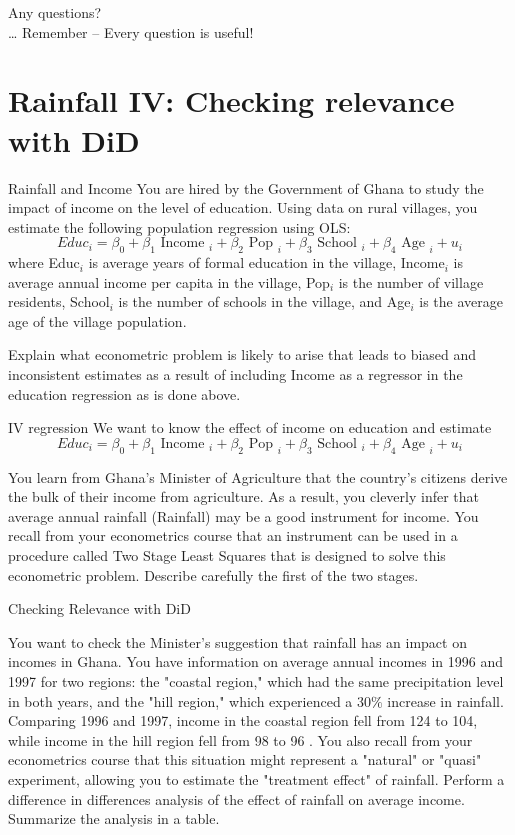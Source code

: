 \documentclass[11pt]{beamer}
\newcommand{\questionslide}[0]{
{\setbeamercolor{palette primary}{fg=black, bg=yellow}
\begin{frame}[standout]
    \raggedright
  Any questions? \\ \vspace{1cm}
  \raggedleft
  \dots{ } Remember -- Every question is useful!
\end{frame}
}}
\begin{document}
\questionslide



\section{Rainfall IV: Checking relevance with DiD}


\begin{frame}{Rainfall and Income}
You are hired by the Government of Ghana to study the impact of income on the level of education. Using data on rural villages, you estimate the following population regression using OLS:
$$
E d u c_i=\beta_0+\beta_1 \text { Income }_i+\beta_2 \text { Pop }_i+\beta_3 \text { School }_i+\beta_4 \text { Age }_i+u_i
$$
where Educ$_i$ is average years of formal education in the village, Income$_i$ is average annual income per capita in the village, Pop$_i$ is the number of village residents, School$_i$ is the number of schools in the village, and Age$_i$ is the average age of the village population.

Explain what econometric problem is likely to arise that leads to biased and inconsistent estimates as a result of including Income as a regressor in the education regression as is done above.
\end{frame}



\begin{frame}{IV regression}
We want to know the effect of income on education and estimate
$$
E d u c_i=\beta_0+\beta_1 \text { Income }_i+\beta_2 \text { Pop }_i+\beta_3 \text { School }_i+\beta_4 \text { Age }_i+u_i
$$


You learn from Ghana's Minister of Agriculture that the country's citizens derive the bulk of their income from agriculture. As a result, you cleverly infer that average annual rainfall (Rainfall) may be a good instrument for income. You recall from your econometrics course that an instrument can be used in a procedure called Two Stage Least Squares that is designed to solve this econometric problem. Describe carefully the first of the two stages.


\end{frame}




\begin{frame}{Checking Relevance with DiD}

You want to check the Minister's suggestion that rainfall has an impact on incomes in Ghana. You have information on average annual incomes in 1996 and 1997 for two regions: the "coastal region," which had the same precipitation level in both years, and the "hill region," which experienced a $30 \%$ increase in rainfall. Comparing 1996 and 1997, income in the coastal region fell from 124 to 104, while income in the hill region fell from 98 to 96 . You also recall from your econometrics course that this situation might represent a "natural" or "quasi" experiment, allowing you to estimate the "treatment effect" of rainfall. Perform a difference in differences analysis of the effect of rainfall on average income. Summarize the analysis in a table.


\end{frame}
\end{document}
